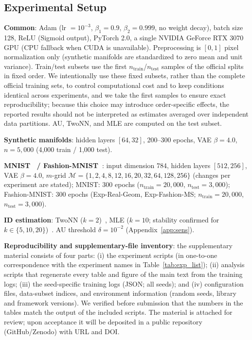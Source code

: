 \documentclass[make,article,submit,pdftex,moreauthors]{Definitions/mdpi}
\begin{document}
\subsection{Experimental Setup}\label{sec:exp_setup}

\textbf{Common}: Adam (lr $= 10^{-3}$, $\beta_1 = 0.9$, $\beta_2 = 0.999$,
no weight decay), batch size 128, ReLU (Sigmoid output), PyTorch 2.0, a
single NVIDIA GeForce RTX 3070 GPU (CPU fallback when CUDA is unavailable).
Preprocessing is $[0,1]$ pixel normalization only (synthetic manifolds are
standardized to zero mean and unit variance).
Train/test subsets use the first $n_{\mathrm{train}}$/$n_{\mathrm{test}}$
samples of the official splits in fixed order.
We intentionally use these fixed subsets, rather than the complete official
training sets, to control computational cost and to keep conditions
identical across experiments, and we take the first samples to ensure exact
reproducibility; because this choice may introduce order-specific effects,
the reported results should not be interpreted as estimates averaged over
independent data partitions.
AU, TwoNN, and MLE are computed on the test subset.

\textbf{Synthetic manifolds}: hidden layers $[64, 32]$, 200--300 epochs,
VAE $\beta = 4.0$, $n = 5{,}000$ (4{,}000 train / 1{,}000 test).

\textbf{MNIST~\cite{lecun1998} / Fashion-MNIST~\cite{xiao2017fashion}}:
input dimension 784, hidden layers
$[512, 256]$, VAE $\beta = 4.0$, $m$-grid
$\mathcal{M} = \{1, 2, 4, 8, 12, 16, 20, 32, 64, 128, 256\}$ (changes per
experiment are stated); MNIST: 300 epochs
($n_{\mathrm{train}} = 20{,}000$, $n_{\mathrm{test}} = 3{,}000$);
Fashion-MNIST: 300 epochs (Exp-Real-Geom, Exp-Fashion-MS;
$n_{\mathrm{train}} = 20{,}000$, $n_{\mathrm{test}} = 3{,}000$).

\textbf{ID estimation}: TwoNN ($k = 2$)~\cite{facco2017twonn}, MLE
($k = 10$; stability confirmed for $k \in \{5, 10, 20\}$)~\cite{levina2005mle}.
AU threshold $\delta = 10^{-2}$ (Appendix~\ref{app:sens}).

\textbf{Reproducibility and supplementary-file inventory}:
the supplementary material consists of four parts:
(i) the experiment scripts (in one-to-one correspondence with the experiment
names in Table~\ref{tab:exp_list});
(ii) analysis scripts that regenerate every table and figure of the main
text from the training logs;
(iii) the seed-specific training logs (JSON; all seeds); and
(iv) configuration files, data-subset indices, and environment information
(random seeds, library and framework versions).
We verified before submission that the numbers in the tables match the
output of the included scripts.
The material is attached for review; upon acceptance it will be deposited in
a public repository (GitHub/Zenodo) with URL and DOI.
\end{document}
